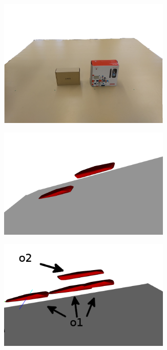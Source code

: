 \begin{figure}[h]
\centering
\begin{subfigure}[t]{0.3\textwidth}
\centering
\includegraphics[width=0.9\textwidth]{Img/convexhull/example_only_top_surfaces.png}
\caption{}\label{fig:rgb_top_surfaces_example}
\end{subfigure}
\begin{subfigure}[t]{0.3\textwidth}
\centering
\includegraphics[width=0.9\textwidth]{Img/convexhull/cv_top.png}
\caption{}\label{fig:cv_top}
\end{subfigure}
\begin{subfigure}[t]{0.3\textwidth}
\centering
\includegraphics[width=0.9\textwidth]{Img/convexhull/cv_top_collision.png}

\end{subfigure}
\end{figure}
